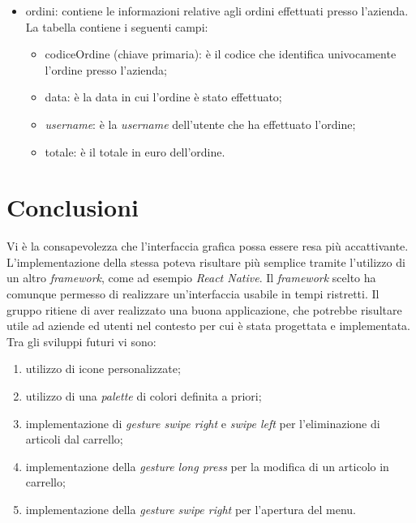 \documentclass[12pt, a4paper, titlepage]{report}
\begin{document}
\begin{itemize}
\begin{itemize}
		\end{itemize}
		\item ordini: contiene le informazioni relative agli ordini effettuati presso l'azienda. La tabella contiene i seguenti campi:
		\begin{itemize}
			\item codiceOrdine (chiave primaria): è il codice che identifica univocamente l'ordine presso l'azienda;
			\item data: è la data in cui l'ordine è stato effettuato;
			\item \textit{username}: è la \textit{username} dell'utente che ha effettuato l'ordine;
			\item totale: è il totale in euro dell'ordine.
		\end{itemize}
	\end{itemize}
	
	\section{Conclusioni}
	
	Vi è la consapevolezza che l'interfaccia grafica possa essere resa più accattivante. L'implementazione della stessa poteva risultare più semplice tramite l'utilizzo di un altro \textit{framework}, come ad esempio \textit{React Native}. Il \textit{framework} scelto ha comunque permesso di realizzare un'interfaccia usabile in tempi ristretti. Il gruppo ritiene di aver realizzato una buona applicazione, che potrebbe risultare utile ad aziende ed utenti nel contesto per cui è stata progettata e implementata. Tra gli sviluppi futuri vi sono:
	\begin{enumerate}
		\item utilizzo di icone personalizzate;
		\item utilizzo di una \textit{palette} di colori definita a priori;
		\item implementazione di \textit{gesture swipe right} e \textit{swipe left} per l'eliminazione di articoli dal carrello;
		\item implementazione della \textit{gesture long press} per la modifica di un articolo in carrello;
		\item implementazione della \textit{gesture swipe right} per l'apertura del menu.
	\end{enumerate} 
\end{document}
